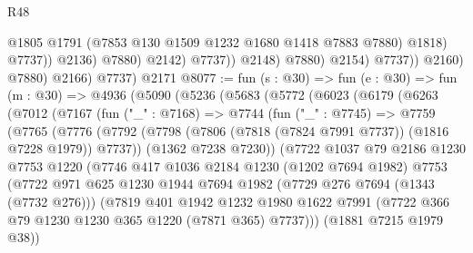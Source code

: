 \begin{lexlean}{R48}
\begin{coremodule}
                                      @1805
                                      @1791
                                      (@7853 @130 @1509 @1232 @1680 @1418 @7883 @7880)
                                      @1818)
                                    @7737))
                                @2136)
                              @7880)
                            @2142)
                          @7737))
                      @2148)
                    @7880)
                  @2154)
                @7737))
            @2160)
          @7880)
        @2166)
      @7737)
    @2171
@8077 := fun (s : @30) =>
  fun (e : @30) =>
  fun (m : @30) =>
  @4936
    (@5090
      (@5236
        (@5683
          (@5772
            (@6023
              (@6179
                (@6263
                  (@7012
                    (@7167
                      (fun ("_" : @7168) =>
                      @7744
                        (fun ("_" : @7745) =>
                        @7759
                          (@7765
                            (@7776
                              (@7792
                                (@7798
                                  (@7806 (@7818 (@7824 @7991 @7737)) (@1816 @7228 @1979))
                                  @7737))
                              (@1362 @7238 @7230))
                            (@7722
                              @1037
                              @79
                              @2186
                              @1230
                              @7753
                              @1220
                              (@7746
                                @417
                                @1036
                                @2184
                                @1230
                                (@1202 @7694 @1982)
                                @7753
                                (@7722
                                  @971
                                  @625
                                  @1230
                                  @1944
                                  @7694
                                  @1982
                                  (@7729 @276 @7694 (@1343 (@7732 @276)))
                                  (@7819
                                    @401
                                    @1942
                                    @1232
                                    @1980
                                    @1622
                                    @7991
                                    (@7722 @366 @79 @1230 @1230 @365 @1220 (@7871 @365) @7737)))
                                (@1881 @7215 @1979 @38))

\end{coremodule}
\end{lexlean}
